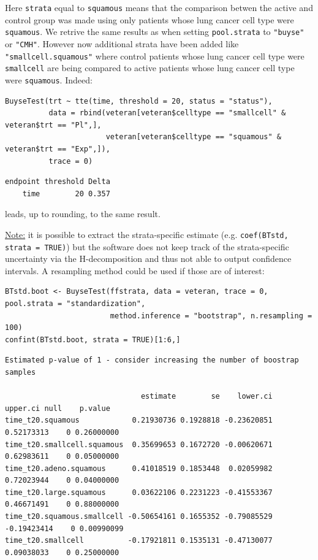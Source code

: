 \documentclass[12pt]{article}
\begin{document}
Here \texttt{strata} equal to \texttt{squamous} means that the comparison betwen the
active and control group was made using only patients whose lung
cancer cell type were \texttt{squamous}. We retrive the same results as when
setting \texttt{pool.strata} to \texttt{"buyse"} or \texttt{"CMH"}. However now additional
strata have been added like \texttt{"smallcell.squamous"} where control
patients whose lung cancer cell type were \texttt{smallcell} are being
compared to active patients whose lung cancer cell type were
\texttt{squamous}. Indeed:
\lstset{language=r,label= ,caption= ,captionpos=b,numbers=none}
\begin{lstlisting}
BuyseTest(trt ~ tte(time, threshold = 20, status = "status"),
          data = rbind(veteran[veteran$celltype == "smallcell" & veteran$trt == "Pl",],
                       veteran[veteran$celltype == "squamous" & veteran$trt == "Exp",]),
          trace = 0)
\end{lstlisting}

\begin{verbatim}
endpoint threshold Delta
    time        20 0.357
\end{verbatim}


leads, up to rounding, to the same result.

\clearpage

\uline{Note:} it is possible to extract the strata-specific estimate
(e.g. \texttt{coef(BTstd, strata = TRUE)}) but the software does not keep
track of the strata-specific uncertainty via the H-decomposition and
thus not able to output confidence intervals. A resampling method
could be used if those are of interest: \newline

\lstset{language=r,label= ,caption= ,captionpos=b,numbers=none}
\begin{lstlisting}
BTstd.boot <- BuyseTest(ffstrata, data = veteran, trace = 0, pool.strata = "standardization",
                        method.inference = "bootstrap", n.resampling = 100)
confint(BTstd.boot, strata = TRUE)[1:6,]
\end{lstlisting}

\begin{verbatim}
Estimated p-value of 1 - consider increasing the number of boostrap samples 

                               estimate        se    lower.ci    upper.ci null    p.value
time_t20.squamous            0.21930736 0.1928818 -0.23620851  0.52173313    0 0.26000000
time_t20.smallcell.squamous  0.35699653 0.1672720 -0.00620671  0.62983611    0 0.05000000
time_t20.adeno.squamous      0.41018519 0.1853448  0.02059982  0.72023944    0 0.04000000
time_t20.large.squamous      0.03622106 0.2231223 -0.41553367  0.46671491    0 0.88000000
time_t20.squamous.smallcell -0.50654161 0.1655352 -0.79085529 -0.19423414    0 0.00990099
time_t20.smallcell          -0.17921811 0.1535131 -0.47130077  0.09038033    0 0.25000000
\end{verbatim}
\end{document}
